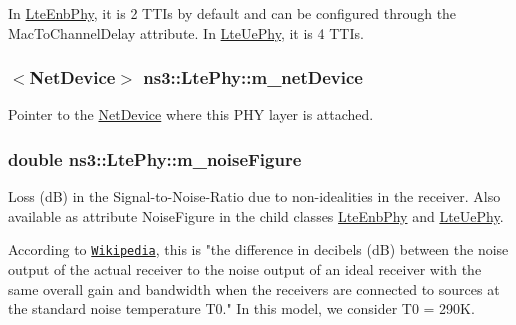 In \hyperlink{classns3_1_1LteEnbPhy}{Lte\+Enb\+Phy}, it is 2 T\+T\+Is by default and can be configured through the {\ttfamily Mac\+To\+Channel\+Delay} attribute. In \hyperlink{classns3_1_1LteUePhy}{Lte\+Ue\+Phy}, it is 4 T\+T\+Is. 
\subsubsection[{\texorpdfstring{m\+\_\+net\+Device}{m_netDevice}}]{$<${\bf Net\+Device}$>$ ns3\+::\+Lte\+Phy\+::m\+\_\+net\+Device\hspace{0.3cm}{\ttfamily [protected]}}\hypertarget{classns3_1_1LtePhy_aa26374d08b66fd1d4f5f1f216475052e}{}\label{classns3_1_1LtePhy_aa26374d08b66fd1d4f5f1f216475052e}


Pointer to the \hyperlink{classns3_1_1NetDevice}{Net\+Device} where this P\+HY layer is attached. 

\subsubsection[{\texorpdfstring{m\+\_\+noise\+Figure}{m_noiseFigure}}]{\setlength{\rightskip}{0pt plus 5cm}double ns3\+::\+Lte\+Phy\+::m\+\_\+noise\+Figure\hspace{0.3cm}{\ttfamily [protected]}}\hypertarget{classns3_1_1LtePhy_a89b2ff50bd38b68e02924bb9d6d193e2}{}\label{classns3_1_1LtePhy_a89b2ff50bd38b68e02924bb9d6d193e2}
Loss (dB) in the Signal-\/to-\/\+Noise-\/\+Ratio due to non-\/idealities in the receiver. Also available as attribute {\ttfamily Noise\+Figure} in the child classes \hyperlink{classns3_1_1LteEnbPhy}{Lte\+Enb\+Phy} and \hyperlink{classns3_1_1LteUePhy}{Lte\+Ue\+Phy}.

According to \href{http://en.wikipedia.org/wiki/Noise_figure}{\tt Wikipedia}, this is "the difference in decibels (dB) between the noise output of the actual receiver to the noise output of an ideal receiver with the same overall gain and bandwidth when the receivers are connected to sources at the standard noise temperature T0." In this model, we consider T0 = 290K. 
